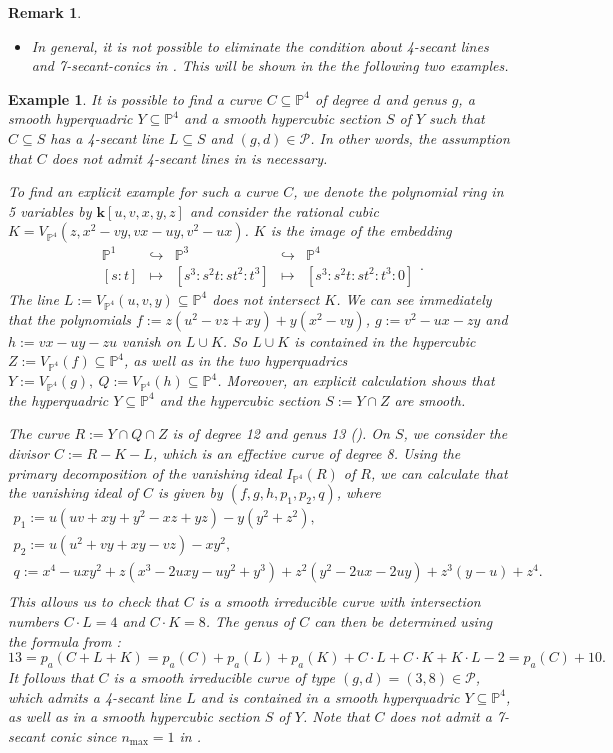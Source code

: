 \documentclass[english,11pt,reqno]{amsart}
\newcommand{\sub}{\subseteq}
\newcommand{\Pone}{\mathbb{P}^1}
\newcommand{\Pthree}{\mathbb{P}^3}
\newcommand{\Pfour}{\mathbb{P}^4}
\newcommand{\VPfour}{V_{\Pfour}}
\newcommand{\kk}{\mathbf{k}}
\newtheorem{rmk}[thm]{Remark}
\newtheorem{ex}[thm]{Example}
\begin{document}
\begin{rmk}
\begin{itemize}
\item In general, it is not possible to eliminate the condition about 4-secant lines and 7-secant-conics in  . This will be shown in the the following two examples.
\end{itemize}
\end{rmk} 
%
\begin{ex}
\label{ex:4_secant_line_neccessary}
It is possible to find a curve $C\sub \Pfour$ of degree $d$ and genus $g$, a smooth hyperquadric $Y\sub \Pfour$ and a smooth hypercubic section $S$ of $Y$ such that $C\sub S$ has a 4-secant line $L \sub S$ and $(g,d)\in \mathcal{P}$. In other words, the assumption that $C$ does not admit 4-secant lines in  is necessary. \par 
To find an explicit example for such a curve $C$, we denote the polynomial ring in 5 variables by $\kk[u,v,x,y,z]$ and consider the rational cubic $K=\VPfour(z, x^2-vy,vx-uy,v^2-ux)$. $K$ is the image of the embedding
$$\begin{matrix}
\Pone & \hookrightarrow & \Pthree &\hookrightarrow &\Pfour\\
[s:t]&\mapsto&[s^3:s^2t:st^2:t^3]&\mapsto&[s^3:s^2t:st^2:t^3:0]
\end{matrix}.$$
The line $L:=\VPfour(u,v,y)\sub \Pfour$ does not intersect $K$. We can see immediately that the polynomials $f:=z(u^2-vz+xy)+y(x^2-vy)$, $g:=v^2-ux-zy$ and $h:=vx-uy-zu$ vanish on $L\cup K$. So $L\cup K$ is contained in the hypercubic 
$Z:=\VPfour(f)\sub\Pfour$, as well as in the two hyperquadrics $Y:=\VPfour(g), \:Q:=\VPfour(h)\sub\Pfour$.
Moreover, an explicit calculation shows that the hyperquadric $Y\sub \Pfour$ and the hypercubic section $S:=Y\cap Z$ are smooth. \par 
The curve $R:=Y\cap Q\cap Z$ is of degree 12 and genus 13 (). On $S$, we consider the divisor $C:=R-K-L$, which is an effective curve of degree 8. 
Using the primary decomposition of the vanishing ideal $I_{\Pfour}(R)$ of $R$, we can calculate that the vanishing ideal of $C$ is given by $(f,g,h,p_1,p_2,q)$, where
\begin{gather*}
p_1:= u(uv+xy+y^2-xz+yz)-y(y^2+z^2),\\
p_2:=u(u^2+vy+xy-vz)-xy^2,\\
q:=x^4-uxy^2+z(x^3-2uxy-uy^2+y^3)+z^2(y^2-2ux-2uy)+z^3(y-u)+z^4.\\
\end{gather*}
This allows us to check that $C$ is a smooth irreducible curve with intersection numbers $C\cdot L=4$ and $C\cdot K=8$. The genus of $C$ can then be determined using the formula from :
$$13=p_a(C+L+K) = p_a(C)+p_a(L)+p_a(K)+C\cdot L+ C\cdot K+K\cdot L-2=p_a(C)+10.$$
It follows that $C$ is a smooth irreducible curve of type $(g,d)=(3,8)\in\mathcal{P}$, which admits a 4-secant line $L$ and is contained in a smooth hyperquadric $Y\sub \Pfour$, as well as in a smooth hypercubic section $S$ of $Y$. Note that $C$ does not admit a 7-secant conic since $n_{\max}=1$ in .
\end{ex}
\end{document}
